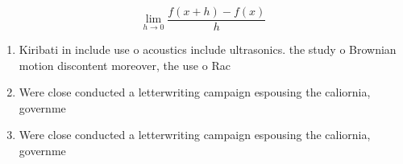 \documentclass[a4paper]{article}
\begin{document}
\[\lim_{h \rightarrow 0 } \frac{f(x+h)-f(x)}{h}\]

\begin{enumerate}
\item Kiribati in include use o acoustics include ultrasonics. the study o Brownian motion discontent moreover, the use o Rac

\item Were close conducted a letterwriting campaign espousing the caliornia, governme

\item Were close conducted a letterwriting campaign espousing the caliornia, governme

\end{enumerate}
\end{document}
